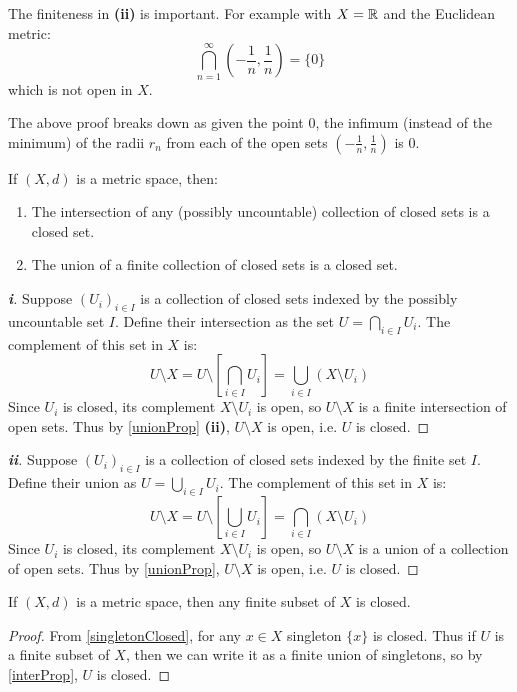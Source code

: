 \documentclass[../main.tex]{subfiles}
\begin{document}
\begin{remark}
  The finiteness in \textbf{(ii)} is important.
  For example with $X = \mathbb{R}$ and the Euclidean metric:
  \[
    \bigcap_{n = 1}^{\infty} \left(-\frac{1}{n}, \frac{1}{n}\right) = \{0\}
  \]
  which is not open in $X$.

  The above proof breaks down as given the point $0$, the infimum (instead of the minimum) of the radii $r_n$ from each of the open sets $(-\frac{1}{n}, \frac{1}{n})$ is 0.
\end{remark}
\begin{theorem}
  If $(X, d)$ is a metric space, then: \label{interProp}
  \begin{enumerate}
    \item The intersection of any (possibly uncountable) collection of closed sets is a closed set.
    \item The union of a finite collection of closed sets is a closed set.
  \end{enumerate}
\end{theorem}
\begin{proof}[\textbf{i}]
  Suppose $(U_i)_{i \in I}$ is a collection of closed sets indexed by the possibly uncountable set $I$.
  Define their intersection as the set $U = \bigcap_{i \in I} U_i$.
  The complement of this set in $X$ is:
  \[
    U \setminus X = U \setminus \left[\bigcap_{i \in I} U_i\right] = \bigcup_{i \in I} (X \setminus U_i)
  \]
  Since $U_i$ is closed, its complement $X \setminus U_i$ is open, so $U \setminus X$ is a finite intersection of open sets.
  Thus by \cref{unionProp} \textbf{(ii)}, $U \setminus X$ is open, i.e. $U$ is closed.
\end{proof}
\begin{proof}[\textbf{ii}]
  Suppose $(U_i)_{i \in I}$ is a collection of closed sets indexed by the finite set $I$.
  Define their union as $U = \bigcup_{i \in I} U_i$.
  The complement of this set in $X$ is:
  \[
    U \setminus X = U \setminus \left[\bigcup_{i \in I} U_i\right] = \bigcap_{i \in I} (X \setminus U_i)
  \]
  Since $U_i$ is closed, its complement $X \setminus U_i$ is open, so $U \setminus X$ is a union of a collection of open sets.
  Thus by \cref{unionProp}, $U \setminus X$ is open, i.e. $U$ is closed.
\end{proof}
\begin{corollary}
  If $(X, d)$ is a metric space, then any finite subset of $X$ is closed. \label{finiteClosed}
\end{corollary}
\begin{proof}
  From \cref{singletonClosed}, for any $x \in X$ singleton $\{x\}$ is closed.
  Thus if $U$ is a finite subset of $X$, then we can write it as a finite union of singletons, so by \cref{interProp}, $U$ is closed.
\end{proof}
\end{document}
